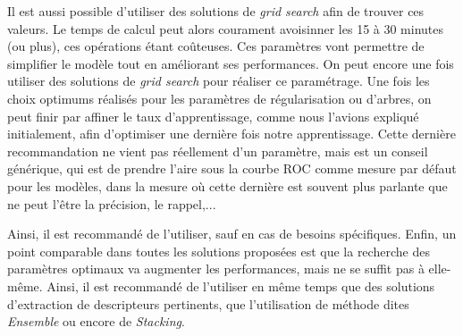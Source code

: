 Il est aussi possible d'utiliser des solutions de \textit{grid search} afin de trouver ces valeurs. Le temps de calcul peut alors courament avoisinner les 15 à 30 minutes (ou plus), ces opérations étant coûteuses.
Ces paramètres vont permettre de simplifier le modèle tout en améliorant ses performances. On peut encore une fois utiliser des solutions de \textit{grid search} pour réaliser ce paramétrage.
Une fois les choix optimums réalisés pour les paramètres de régularisation ou d'arbres, on peut finir par affiner le taux d'apprentissage, comme nous l'avions expliqué initialement, afin d'optimiser une dernière fois notre apprentissage.
Cette dernière recommandation ne vient pas réellement d'un paramètre, mais est un conseil générique, qui est de prendre l'aire sous la courbe ROC comme mesure par défaut pour les modèles, dans la mesure où cette dernière est souvent plus parlante que ne peut l'être la précision, le rappel,...

Ainsi, il est recommandé de l'utiliser, sauf en cas de besoins spécifiques.
Enfin, un point comparable dans toutes les solutions proposées est que la recherche des paramètres optimaux va augmenter les performances, mais ne se suffit pas à elle-même. Ainsi, il est recommandé de l'utiliser en même temps que des solutions d'extraction de descripteurs pertinents, que l'utilisation de méthode dites \textit{Ensemble} ou encore de \textit{Stacking}.
